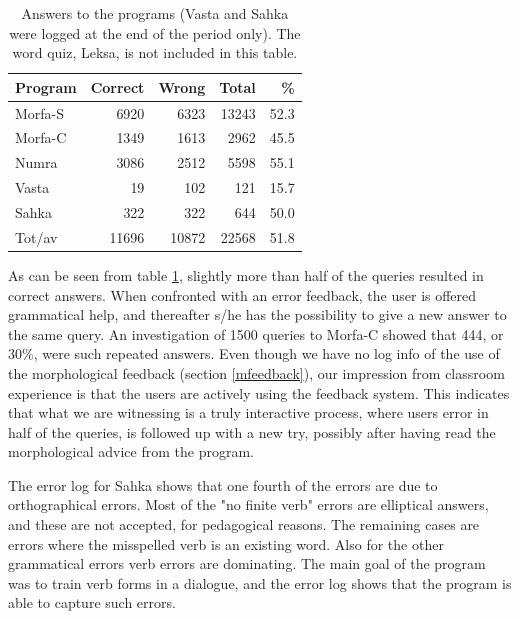 \documentclass[11pt]{article}
\begin{document}
\begin{table}[htdp]
\caption{Answers to the programs (Vasta and Sahka were logged at the end of the period only). The word quiz, Leksa, is not included in this table.}
\begin{center}
\begin{tabular}{|l|r|r|r|r|}
\hline
Program     & Correct &   Wrong &    Total &  \% \\
\hline									 
Morfa-S  &  6920   & 6323    & 13243    & 52.3 \\
Morfa-C  &  1349   & 1613    & 2962	    & 45.5  \\
Numra    &  3086   & 2512    & 5598	    & 55.1  \\
Vasta    &   19    &   102   &  121	    & 15.7 \\
Sahka    &   322   &   322   &  644	    & 50.0  \\
\hline
Tot/av   & 11696  & 10872  & 22568  & 51.8 \\
\hline
\end{tabular}
\end{center}
\label{log1}
\end{table}


As can be seen from table \ref{log1}, slightly more than half of the queries resulted in correct answers. When confronted with an error feedback, the user is offered grammatical help, and thereafter s/he has the possibility to give a new answer to the same query. An investigation of 1500 queries to Morfa-C showed that 444, or 30\%, were such repeated answers. Even though we have no log info of the use of the morphological feedback (section \ref{mfeedback}), our impression from classroom experience is that the users are actively using the feedback system. This indicates that what we are witnessing is a truly interactive process, where users error in half of the queries, is followed up with a new try, possibly after having read the morphological advice from the program.

The error log for Sahka shows that one fourth of the errors are due to orthographical errors. Most of the "no finite verb" errors are elliptical answers, and these are not accepted, for pedagogical reasons. The remaining cases are errors where the misspelled verb is an existing word. Also for the other grammatical errors verb errors are dominating. The main goal of the program was to train verb forms in a dialogue, and the error log shows that the program is able to capture such errors.
\end{document}

